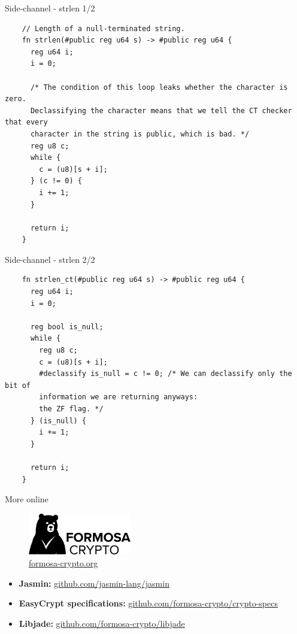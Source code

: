 \begin{frame}[fragile]{Side-channel - strlen 1/2}
  \lstset{
    language=Jasmin,
    basicstyle=\footnotesize\ttfamily,
    escapechar=~~,
  }
  \begin{lstlisting}
    // Length of a null-terminated string.
    fn strlen(#public reg u64 s) -> #public reg u64 {
      reg u64 i;
      i = 0;

      /* The condition of this loop leaks whether the character is zero.
      Declassifying the character means that we tell the CT checker that every
      character in the string is public, which is bad. */
      reg u8 c;
      while {
        c = (u8)[s + i];
      } (c != 0) {
        i += 1;
      }

      return i;
    }
  \end{lstlisting}
\end{frame}

\begin{frame}[fragile]{Side-channel - strlen 2/2}
  \lstset{
    language=Jasmin,
    basicstyle=\footnotesize\ttfamily,
    escapechar=~~,
  }
  \begin{lstlisting}
    fn strlen_ct(#public reg u64 s) -> #public reg u64 {
      reg u64 i;
      i = 0;

      reg bool is_null;
      while {
        reg u8 c;
        c = (u8)[s + i];
        #declassify is_null = c != 0; /* We can declassify only the bit of
        information we are returning anyways:
        the ZF flag. */
      } (is_null) {
        i += 1;
      }

      return i;
    }
  \end{lstlisting}
\end{frame}


\begin{frame}{More online}
  \begin{center}
    \begin{figure}[t]
      \centering
      \includegraphics[width=0.4\textwidth]{formosa}
      \caption*{\Large \url{formosa-crypto.org}}
    \end{figure}
  \end{center}
  \vspace*{.5cm}
  \begin{itemize}
  \item[] \textbf{Jasmin:} \url{github.com/jasmin-lang/jasmin}
  \item[] \textbf{EasyCrypt specifications:}
    \url{github.com/formosa-crypto/crypto-specs}
  \item[] \textbf{Libjade:} \url{github.com/formosa-crypto/libjade}
  \end{itemize}
\end{frame}

